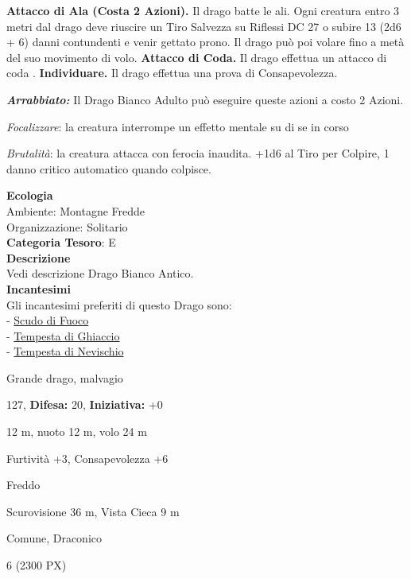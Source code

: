 \begin{multicols}{2}
{\textbf{Attacco di Ala (Costa 2 Azioni).} Il drago batte le ali. Ogni creatura entro 3 metri dal drago deve riuscire un Tiro Salvezza su Riflessi DC 27 o subire 13 (2d6 + 6) danni contundenti e venir gettato prono. Il drago può poi volare fino a metà del suo movimento di volo. \textbf{Attacco di Coda.} Il drago effettua un attacco di coda
.
\textbf{Individuare.} Il drago effettua una prova di Consapevolezza.

\emph{\textbf{Arrabbiato:}} Il Drago Bianco Adulto può eseguire queste azioni a costo 2 Azioni.

\emph{Focalizzare}: la creatura interrompe un effetto mentale su di se in corso

\emph{Brutalità}: la creatura attacca con ferocia inaudita. +1d6 al Tiro per Colpire, 1 danno critico automatico quando colpisce.

\textbf{Ecologia}\\
Ambiente: Montagne Fredde\\
Organizzazione: Solitario\\
\textbf{Categoria Tesoro}: E\\
\textbf{Descrizione}\\
Vedi descrizione Drago Bianco Antico.\\
\textbf{Incantesimi}\\
Gli incantesimi preferiti di questo Drago sono:\\
- \hyperlink{Scudo di Fuoco}{Scudo di Fuoco}\\
- \hyperlink{Tempesta di Ghiaccio}{Tempesta di Ghiaccio}\\
- \hyperlink{Tempesta di Nevischio}{Tempesta di Nevischio}

\noindent
\begin{description}[noitemsep, topsep=0pt, parsep=0pt, partopsep=0pt, leftmargin=0cm, labelwidth=2.2cm]
	\item[\textbf{Taglia/Tipo:}] Grande drago, malvagio
	\item[\textbf{Caratt.:}] 
	\item[\textbf{Punti Ferita:}] 127,  \textbf{Difesa:} 20,  \textbf{Iniziativa:} +0
	\item[\textbf{Movimento:}] 12 m, nuoto 12 m, volo 24 m
	\item[\textbf{Tiri Salvez.:}] 
	\item[\textbf{Comp.:}] Furtività +3, Consapevolezza +6
	\item[\textbf{Imm. Danni:}] Freddo
	\item[\textbf{Sensi:}] Scurovisione 36 m, Vista Cieca 9 m
	\item[\textbf{Linguaggi:}] Comune, Draconico
	\item[\textbf{Sfida:}] 6 (2300 PX)\smallskip
\end{description}

}
\end{multicols}
